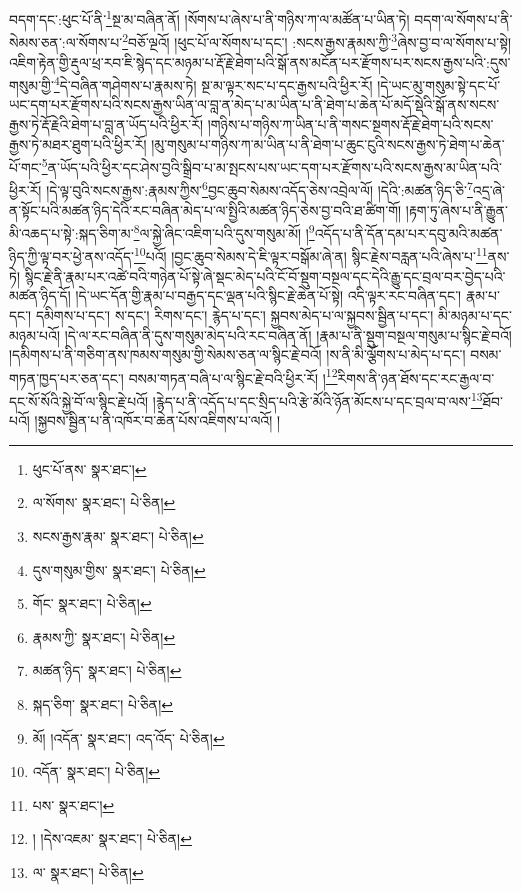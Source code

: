 བདག་དང་:ཕུང་པོ་ནི་\footnote{ཕུང་པོ་ནས་  སྣར་ཐང་། }སྔ་མ་བཞིན་ནོ། །སོགས་པ་ཞེས་པ་ནི་གཉིས་ཀ་ལ་མཚོན་པ་ཡིན་ཏེ། བདག་ལ་སོགས་པ་ནི་སེམས་ཅན་:ལ་སོགས་པ་\footnote{ལ་སོགས་  སྣར་ཐང་།  པེ་ཅིན། }བཅོ་ལྔའོ། །ཕུང་པོ་ལ་སོགས་པ་དང་། :སངས་རྒྱས་རྣམས་ཀྱི་\footnote{སངས་རྒྱས་རྣམ་  སྣར་ཐང་།  པེ་ཅིན། }ཞེས་བྱ་བ་ལ་སོགས་པ་སྟེ། འཇིག་རྟེན་གྱི་རྡུལ་ཕྲ་རབ་ཇི་སྙེད་དང་མཉམ་པ་རྡོ་རྗེ་ཐེག་པའི་སྒོ་ནས་མངོན་པར་རྫོགས་པར་སངས་རྒྱས་པའི་:དུས་གསུམ་གྱི་\footnote{དུས་གསུམ་གྱིས་  སྣར་ཐང་།  པེ་ཅིན། }དེ་བཞིན་གཤེགས་པ་རྣམས་ཏེ། སྔ་མ་ལྟར་སང་པ་དང་རྒྱས་པའི་ཕྱིར་རོ། །དེ་ཡང་མུ་གསུམ་སྟེ་དང་པོ་ཡང་དག་པར་རྫོགས་པའི་སངས་རྒྱས་ཡིན་ལ་བླ་ན་མེད་པ་མ་ཡིན་པ་ནི་ཐེག་པ་ཆེན་པོ་མདོ་སྡེའི་སྒོ་ནས་སངས་རྒྱས་ཏེ་རྡོ་རྗེའི་ཐེག་པ་བླ་ན་ཡོད་པའི་ཕྱིར་རོ། །གཉིས་པ་གཉིས་ཀ་ཡིན་པ་ནི་གསང་སྔགས་རྡོ་རྗེ་ཐེག་པའི་སངས་རྒྱས་ཏེ་མཐར་ཐུག་པའི་ཕྱིར་རོ། །མུ་གསུམ་པ་གཉིས་ཀ་མ་ཡིན་པ་ནི་ཐེག་པ་ཆུང་ངུའི་སངས་རྒྱས་ཏེ་ཐེག་པ་ཆེན་པོ་གང་\footnote{གོང་  སྣར་ཐང་།  པེ་ཅིན། }ན་ཡོད་པའི་ཕྱིར་དང་ཤེས་བྱའི་སྒྲིབ་པ་མ་སྤངས་པས་ཡང་དག་པར་རྫོགས་པའི་སངས་རྒྱས་མ་ཡིན་པའི་ཕྱིར་རོ། །དེ་ལྟ་བུའི་སངས་རྒྱས་:རྣམས་ཀྱིས་\footnote{རྣམས་ཀྱི་  སྣར་ཐང་།  པེ་ཅིན། }བྱང་ཆུབ་སེམས་འདོད་ཅེས་འབྲེལ་ལོ། །དེའི་:མཚན་ཉིད་ཅི་\footnote{མཚན་ཉིད་  སྣར་ཐང་།  པེ་ཅིན། }འདྲ་ཞེ་ན་སྟོང་པའི་མཚན་ཉིད་དེའི་རང་བཞིན་མེད་པ་ལ་སྤྱིའི་མཚན་ཉིད་ཅེས་བྱ་བའི་ཐ་ཚིག་གོ། །རྟག་ཏུ་ཞེས་པ་ནི་རྒྱུན་མི་འཆད་པ་སྟེ་:སྐད་ཅིག་མ་\footnote{སྐད་ཅིག་  སྣར་ཐང་།  པེ་ཅིན། }ལ་སྐྱེ་ཞིང་འཇིག་པའི་དུས་གསུམ་མོ། །\footnote{མོ། །འདོན་  སྣར་ཐང་། འད་འོད་  པེ་ཅིན། }འདོད་པ་ནི་དོན་དམ་པར་དབུ་མའི་མཚན་ཉིད་ཀྱི་ལྟ་བར་ཕྱེ་ནས་འདོད་\footnote{འདོན་  སྣར་ཐང་།  པེ་ཅིན། }པའོ། །བྱང་ཆུབ་སེམས་དེ་ཇི་ལྟར་བསྒོམ་ཞེ་ན། སྙིང་རྗེས་བརླན་པའི་ཞེས་པ་\footnote{པས་  སྣར་ཐང་། }ནས་ཏེ། སྙིང་རྗེ་ནི་རྣམ་པར་འཚེ་བའི་གཉེན་པོ་སྟེ་ཞེ་སྡང་མེད་པའི་ངོ་བོ་སྡུག་བསྔལ་དང་དེའི་རྒྱུ་དང་བྲལ་བར་བྱེད་པའི་མཚན་ཉིད་དོ། །དེ་ཡང་དོན་གྱི་རྣམ་པ་བརྒྱད་དང་ལྡན་པའི་སྙིང་རྗེ་ཆེན་པོ་སྟེ། འདི་ལྟར་རང་བཞིན་དང་། རྣམ་པ་དང་། དམིགས་པ་དང་། ས་དང་། རིགས་དང་། རྙེད་པ་དང་། སྐྱབས་མེད་པ་ལ་སྐྱབས་སྦྱིན་པ་དང་། མི་མཉམ་པ་དང་མཉམ་པའོ། །དེ་ལ་རང་བཞིན་ནི་དུས་གསུམ་མེད་པའི་རང་བཞིན་ནོ། །རྣམ་པ་ནི་སྡུག་བསྔལ་གསུམ་པ་སྙིང་རྗེ་བའོ། །དམིགས་པ་ནི་གཅིག་ནས་ཁམས་གསུམ་གྱི་སེམས་ཅན་ལ་སྙིང་རྗེ་བའོ། །ས་ནི་མི་ལྕོགས་པ་མེད་པ་དང་། བསམ་གཏན་ཁྱད་པར་ཅན་དང་། བསམ་གཏན་བཞི་པ་ལ་སྙིང་རྗེ་བའི་ཕྱིར་རོ། །\footnote{། །དེས་འཇམ་  སྣར་ཐང་།  པེ་ཅིན། }རིགས་ནི་ཉན་ཐོས་དང་རང་རྒྱལ་བ་དང་སོ་སོའི་སྐྱེ་བོ་ལ་སྙིང་རྗེ་པའོ། །རྙེད་པ་ནི་འདོད་པ་དང་སྲིད་པའི་རྩེ་མོའི་ཉོན་མོངས་པ་དང་བྲལ་བ་ལས་\footnote{ལ་  སྣར་ཐང་།  པེ་ཅིན། }ཐོབ་པའོ། །སྐྱབས་སྦྱིན་པ་ནི་འཁོར་བ་ཆེན་པོས་འཇིགས་པ་ལའོ། །
